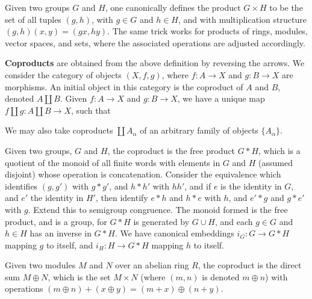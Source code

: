 \begin{example}
    Given two groups $G$ and $H$, one canonically defines the product $G \times H$ to be the set of all tuples $(g,h)$, with $g \in G$ and $h \in H$, and with multiplication structure $(g,h)(x,y) = (gx,hy)$. The same trick works for products of rings, modules, vector spaces, and sets, where the associated operations are adjusted accordingly.
\end{example}

{\bf Coproducts} are obtained from the above definition by reversing the arrows. We consider the category of objects $(X,f,g)$, where $f: A \to X$ and $g: B \to X$ are morphisms. An initial object in this category is the coproduct of $A$ and $B$, denoted $A \coprod B$. Given $f: A \to X$ and $g: B \to X$, we have a unique map $f \coprod g: A \coprod B \to X$, such that
%
\begin{center}
\end{center}
%
We may also take coproducts $\coprod A_\alpha$ of an arbitrary family of objects $\{ A_\alpha \}$.

\begin{example}
    Given two groups, $G$ and $H$, the coproduct is the free product $G * H$, which is a quotient of the monoid of all finite words with elements in $G$ and $H$ (assumed disjoint) whose operation is concatenation. Consider the equivalence which identifies $(g,g')$ with $g * g'$, and $h * h'$ with $hh'$, and if $e$ is the identity in $G$, and $e'$ the identity in $H'$, then identify $e * h$ and $h * e$ with $h$, and $e' * g$ and $g * e'$ with $g$. Extend this to semigroup congruence. The monoid formed is the free product, and is a group, for $G * H$ is generated by $G \cup H$, and each $g \in G$ and $h \in H$ has an inverse in $G * H$. We have canonical embeddings $i_G: G \to G * H$ mapping $g$ to itself, and $i_H: H \to G * H$ mapping $h$ to itself.
\end{example}

\begin{example}
    Given two modules $M$ and $N$ over an abelian ring $R$, the coproduct is the direct sum $M \oplus N$, which is the set $M \times N$ (where $(m,n)$ is denoted $m \oplus n$) with operations $(m \oplus n) + (x \oplus y) = (m + x) \oplus (n + y)$.
\end{example}

